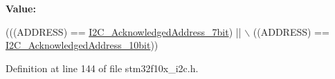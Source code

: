 {\bfseries Value\+:}
\begin{DoxyCode}
(((ADDRESS) == \hyperlink{group___i2_c__acknowledged__address_ga5e5ad2148f9da14457c7b59357acee97}{I2C\_AcknowledgedAddress\_7bit}) || \(\backslash\)
                                             ((ADDRESS) == 
      \hyperlink{group___i2_c__acknowledged__address_gaf0bb8f71795f046ad9f6c1fc7fe0fc53}{I2C\_AcknowledgedAddress\_10bit}))
\end{DoxyCode}


Definition at line 144 of file stm32f10x\+\_\+i2c.\+h.

